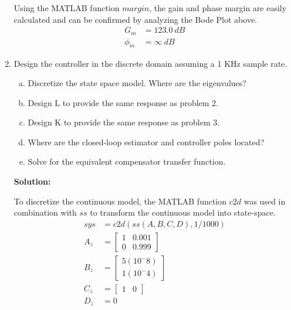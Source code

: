 \documentclass[11pt]{article}
\newcommand{\solution}{\textbf{Solution: \\}}
\begin{document}
\begin{enumerate}[label=\textbf{\arabic*.}]
  Using the MATLAB function $margin$, the gain and phase margin are easily 
  calculated and can be confirmed by analyzing the Bode Plot above.
  \begin{equation}
    \begin{split}
      G_m &= 123.0 \:\si{dB} \\
      \phi_m &= \infty \:\si{dB}
    \end{split}
  \end{equation}

  \vspace{24pt}
  \item Design the controller in the discrete domain assuming a 1 KHz sample rate.
  \begin{enumerate}[(a)]
    \itemsep -6pt
    \item Discretize the state space model. Where are the eigenvalues?
    \item Design L to provide the same response as problem 2.
    \item Design K to provide the same response as problem 3.
    \item Where are the closed-loop estimator and controller poles located?
    \item Solve for the equivalent compensator transfer function.
  \end{enumerate}
  \solution

  To discretize the continuous model, the MATLAB function $c2d$ was used in 
  combination with $ss$ to transform the continuous model into state-space.
  \begin{equation}
    \begin{split}
      sys &= c2d(ss(A,B,C,D), 1/1000) \\
      A_z &= 
      \begin{bmatrix}
        1 & 0.001 \\ 0 & 0.999
      \end{bmatrix} \\
      B_z &= 
      \begin{bmatrix}
        5(10^-8) \\ 1(10^-4)
      \end{bmatrix} \\
      C_z &=
      \begin{bmatrix}
        1 & 0
      \end{bmatrix} \\
      D_z &= 0
    \end{split}
  \end{equation}


\end{enumerate}
\end{document}
